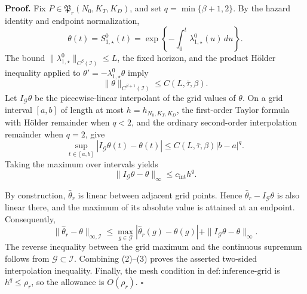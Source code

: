 \textbf{Proof.}
Fix \(P\in\mathfrak P_r(N_0,K_T,K_D)\), and set
\(q=\min\{\beta+1,2\}\).  By the hazard identity and endpoint
normalization,
\[
 \theta(t)=S^0_{1,\star}(t)
 =\exp\left\{-\int_0^t\lambda^0_{1,\star}(u)\,du\right\}.
\]
The bound \(\|\lambda^0_{1,\star}\|_{C^\beta(\mathcal I)}\le L\), the
fixed horizon, and the product H\"older inequality applied to
\(\theta'=-\lambda^0_{1,\star}\theta\) imply
\[
 \|\theta\|_{C^{\beta+1}(\mathcal I)}
 \le C(L,\bar\tau,\beta).                                   \tag{1}
\]
Let \(I_{\mathcal G}\theta\) be the piecewise-linear interpolant of the
grid values of \(\theta\).  On a grid interval \([a,b]\) of length at most
\(h=h_{N_0,K_T,K_D}\), the first-order Taylor formula with H\"older
remainder when \(q<2\), and the ordinary second-order interpolation
remainder when \(q=2\), give
\[
 \sup_{t\in[a,b]}|I_{\mathcal G}\theta(t)-\theta(t)|
 \le C(L,\bar\tau,\beta)|b-a|^q.
\]
Taking the maximum over intervals yields
\[
 \|I_{\mathcal G}\theta-\theta\|_\infty
 \le c_{\mathrm{int}}h^q.                                  \tag{2}
\]

By construction, \(\widehat\theta_r\) is linear between adjacent grid
points.  Hence \(\widehat\theta_r-I_{\mathcal G}\theta\) is also linear
there, and the maximum of its absolute value is attained at an endpoint.
Consequently,
\[
 \|\widehat\theta_r-\theta\|_{\infty,\mathcal I}
 \le \max_{g\in\mathcal G}|\widehat\theta_r(g)-\theta(g)|
 +\|I_{\mathcal G}\theta-\theta\|_\infty.                  \tag{3}
\]
The reverse inequality between the grid maximum and the continuous
supremum follows from \(\mathcal G\subset\mathcal I\).  Combining (2)--(3)
proves the asserted two-sided interpolation inequality.  Finally, the mesh
condition in \(\mathrm{def:inference\mbox{-}grid}\) is \(h^q\le\rho_r\),
so the allowance is \(O(\rho_r)\). \(\square\)